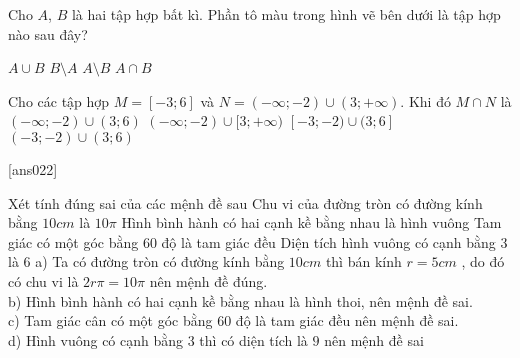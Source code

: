 \begin{ex}
	Cho $A$, $B$ là hai tập hợp bất kì. Phần tô màu trong hình vẽ bên dưới là tập hợp nào sau đây?\\
	\begin{center}
		\def\firstcircle{(0,0) circle (1.5cm)}
		\def\secondcircle{(0:2cm) circle (1.5cm)}



		\setlength{\parskip}{5mm}
	\end{center}
	\choice
	{$A\cup B$}
	{$B\setminus A$}
	{$A\setminus B$}
	{\True $A\cap B$}
\end{ex}

\begin{ex}
	Cho các tập hợp $M=[-3;6]$ và $N=(-\infty; -2)\cup (3;+\infty)$. Khi đó $M\cap N$ là
	\choice
	{$(-\infty;-2)\cup (3;6)$}
	{$(-\infty;-2)\cup [3;+\infty)$}
	{\True $[-3;-2)\cup (3;6]$}
	{$(-3;-2)\cup (3;6)$}
\end{ex}
\TNTF
\setcounter{ex}{0}
[ans022]

\begin{ex}
	Xét tính đúng sai của các mệnh đề sau
	\choiceTF
	{\True Chu vi của đường tròn có đường kính bằng $10 cm$ là $10\pi$}
	{Hình bình hành có hai cạnh kề bằng nhau là hình vuông}
	{Tam giác có một góc bằng 60 độ là tam giác đều}
	{Diện tích hình vuông có cạnh bằng $3$ là $6$}
	\loigiai
	{
	a)	Ta có đường tròn có đường kính bằng $10 cm$ thì bán kính $r=5 cm$ , do đó có chu vi là $2r\pi=10\pi$ nên mệnh đề đúng.\\
	b)	Hình bình hành có hai cạnh kề bằng nhau là hình thoi, nên mệnh đề sai. \\
	c)	Tam giác cân có một góc bằng $60$ độ là tam giác đều nên mệnh đề sai.\\
	d) Hình vuông có cạnh bằng $3$ thì có diện tích là $9$ nên mệnh đề sai
	}
\end{ex}

